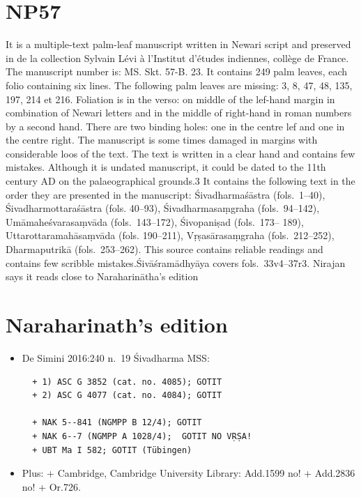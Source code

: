 \documentclass[12pt]{book}
\begin{document}
{%
\section{NP57}\label{np57}}



It is a multiple-text palm-leaf manuscript written in Newari script and
preserved in de la collection Sylvain Lévi à l'Institut d'études
indiennes, collège de France. The manuscript number is: MS. Skt. 57-B.
23. It contains 249 palm leaves, each folio containing six lines. The
following palm leaves are missing: 3, 8, 47, 48, 135, 197, 214 et 216.
Foliation is in the verso: on middle of the lef-hand margin in
combination of Newari letters and in the middle of right-hand in roman
numbers by a second hand. There are two binding holes: one in the centre
lef and one in the centre right. The manuscript is some times damaged in
margins with considerable loos of the text. The text is written in a
clear hand and contains few mistakes. Although it is undated manuscript,
it could be dated to the 11th century AD on the palaeographical
grounds.3 It contains the following text in the order they are presented
in the manuscript: Śivadharmaśāstra (fols.~1--40), Śivadharmottaraśāstra
(fols. 40--93), Śivadharmasaṃgraha (fols.~94--142), Umāmaheśvarasaṃvāda
(fols.~143--172), Śivopaniṣad (fols.~173-- 189), Uttarottaramahāsaṃvāda
(fols. 190--211), Vṛṣasārasaṃgraha (fols.~212--252), Dharmaputrikā
(fols.~253--262). This source contains reliable readings and contains
few scribble mistakes.Śivāśramādhyāya covers fols.~33v4--37r3. Nirajan
says it reads close to Naraharinātha's edition

{%
\section{Naraharinath's edition}\label{naraharinaths-edition}}

\begin{itemize}
\item
  De Simini 2016:240 n.~19 Śivadharma MSS:

\begin{verbatim}
  + 1) ASC G 3852 (cat. no. 4085); GOTIT 
  + 2) ASC G 4077 (cat. no. 4084); GOTIT

  + NAK 5--841 (NGMPP B 12/4); GOTIT 
  + NAK 6--7 (NGMPP A 1028/4);  GOTIT NO VṚṢA! 
  + UBT Ma I 582; GOTIT (Tübingen)
\end{verbatim}
\item
  Plus: + Cambridge, Cambridge University Library: Add.1599 no! +
  Add.2836 no! + Or.726.
\end{itemize}
\end{document}
